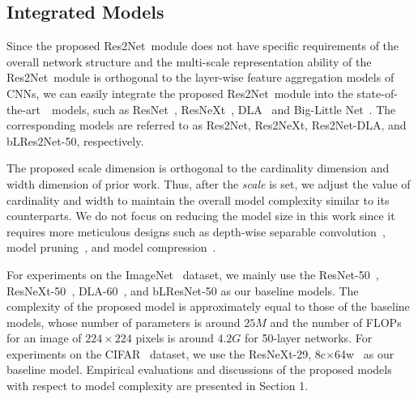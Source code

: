 \documentclass[10pt,journal,cspaper,compsoc]{IEEEtran}
\newcommand{\secref}[1]{Section 1}
\newcommand{\secref}[1]{Sec.~\ref{#1}}
\newcommand{\cmm}[1]{{\textcolor{blue}{#1}}}
\newcommand{\myPara}[1]{\subsubsection{#1}}
\newcommand{\ourM}{{Res2Net}}
\newcommand{\sArt}{{state-of-the-art~}}
\begin{document}
\subsection{Integrated Models}

Since the proposed \ourM~module does not have specific requirements of
the overall network structure
and the multi-scale representation ability of the \ourM~module is orthogonal to
the layer-wise feature aggregation models of CNNs,
we can easily integrate the proposed \ourM~module into the \sArt~models,
such as ResNet~\cite{he2016deep},
ResNeXt~\cite{xie2017aggregated}, DLA~\cite{yu2018deep} 
and Big-Little Net~\cite{chen2018biglittle}.
%
The corresponding models are referred to as
\ourM, Res2NeXt, Res2Net-DLA, and bLRes2Net-50,  respectively.

The proposed scale dimension is orthogonal to the cardinality
\cite{xie2017aggregated}
dimension and width \cmm{\cite{he2016deep}} dimension of prior work.
%
Thus, after the \emph{scale} is set,
we adjust the value of cardinality and width to maintain the overall
model complexity similar to its counterparts.
%
We do not focus on reducing the model size in this work
since it requires more meticulous designs such as depth-wise separable
convolution~\cite{Ma_2018_ECCV},
model pruning~\cite{han2015learning}, 
and model compression~\cite{cheng2017survey}.



For experiments on the ImageNet~\cite{russakovsky2015imagenet} dataset,
%
we mainly use the ResNet-50~\cite{he2016deep}, ResNeXt-50~\cite{xie2017aggregated},
DLA-60~\cite{yu2018deep}, and bLResNet-50 \cite{chen2018biglittle}
as our baseline models.
%
The complexity of the proposed model is approximately equal to 
those of the baseline models,
whose number of parameters is around $25M$ and the number of FLOPs
for an image of $224 \times 224$ pixels is around $4.2G$
for 50-layer networks.
%
For experiments on the CIFAR~\cite{krizhevsky2009learning} dataset,
we use the ResNeXt-29, 8c$\times$64w~\cite{xie2017aggregated} 
as our baseline model.
%
Empirical evaluations and discussions of the proposed models with respect to
model complexity are presented in \secref{sec:compare_dimentions}.
\end{document}

